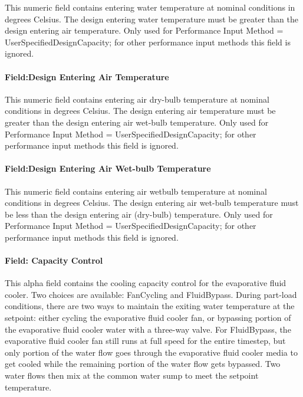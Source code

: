 This numeric field contains entering water temperature at nominal conditions in degrees Celsius. The design entering water temperature must be greater than the design entering air temperature. Only used for Performance Input Method = UserSpecifiedDesignCapacity; for other performance input methods this field is ignored.

\paragraph{Field:Design Entering Air Temperature}\label{fielddesign-entering-air-temperature}

This numeric field contains entering air dry-bulb temperature at nominal conditions in degrees Celsius. The design entering air temperature must be greater than the design entering air wet-bulb temperature. Only used for Performance Input Method = UserSpecifiedDesignCapacity; for other performance input methods this field is ignored.

\paragraph{Field:Design Entering Air Wet-bulb Temperature}\label{fielddesign-entering-air-wet-bulb-temperature}

This numeric field contains entering air wetbulb temperature at nominal conditions in degrees Celsius. The design entering air wet-bulb temperature must be less than the design entering air (dry-bulb) temperature. Only used for Performance Input Method = UserSpecifiedDesignCapacity; for other performance input methods this field is ignored.

\paragraph{Field: Capacity Control}\label{field-capacity-control}

This alpha field contains the cooling capacity control for the evaporative fluid cooler. Two choices are available: FanCycling and FluidBypass. During part-load conditions, there are two ways to maintain the exiting water temperature at the setpoint: either cycling the evaporative fluid cooler fan, or bypassing portion of the evaporative fluid cooler water with a three-way valve. For FluidBypass, the evaporative fluid cooler fan still runs at full speed for the entire timestep, but only portion of the water flow goes through the evaporative fluid cooler media to get cooled while the remaining portion of the water flow gets bypassed. Two water flows then mix at the common water sump to meet the setpoint temperature.


